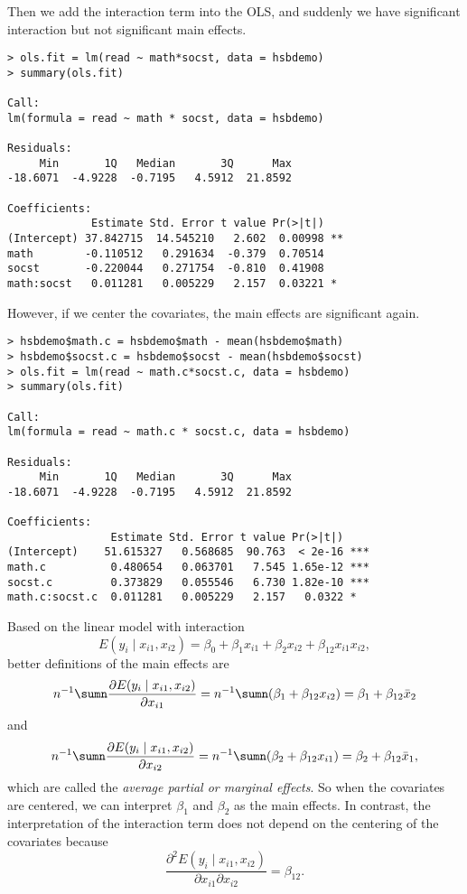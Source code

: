 Then we add the interaction term into the OLS, and suddenly we have
significant interaction but not significant main effects. 
\begin{lstlisting}
> ols.fit = lm(read ~ math*socst, data = hsbdemo)
> summary(ols.fit)

Call:
lm(formula = read ~ math * socst, data = hsbdemo)

Residuals:
     Min       1Q   Median       3Q      Max 
-18.6071  -4.9228  -0.7195   4.5912  21.8592 

Coefficients:
             Estimate Std. Error t value Pr(>|t|)   
(Intercept) 37.842715  14.545210   2.602  0.00998 **
math        -0.110512   0.291634  -0.379  0.70514   
socst       -0.220044   0.271754  -0.810  0.41908   
math:socst   0.011281   0.005229   2.157  0.03221 * 
\end{lstlisting}

However, if we center the covariates, the main effects are significant again. 
\begin{lstlisting}
> hsbdemo$math.c = hsbdemo$math - mean(hsbdemo$math)
> hsbdemo$socst.c = hsbdemo$socst - mean(hsbdemo$socst)
> ols.fit = lm(read ~ math.c*socst.c, data = hsbdemo)
> summary(ols.fit)

Call:
lm(formula = read ~ math.c * socst.c, data = hsbdemo)

Residuals:
     Min       1Q   Median       3Q      Max 
-18.6071  -4.9228  -0.7195   4.5912  21.8592 

Coefficients:
                Estimate Std. Error t value Pr(>|t|)    
(Intercept)    51.615327   0.568685  90.763  < 2e-16 ***
math.c          0.480654   0.063701   7.545 1.65e-12 ***
socst.c         0.373829   0.055546   6.730 1.82e-10 ***
math.c:socst.c  0.011281   0.005229   2.157   0.0322 *  
\end{lstlisting}


Based on the linear model with interaction
$$
E(y_i\mid x_{i1}, x_{i2}) = \beta_0 + \beta_1 x_{i1} + \beta_2 x_{i2} + \beta_{12} x_{i1} x_{i2},
$$
better definitions of the main effects are
$$
n^{-1} \sumn \frac{  \partial E(y_i\mid x_{i1}, x_{i2}) }{ \partial x_{i1} } = n^{-1} \sumn ( \beta_1 +  \beta_{12}   x_{i2}  )
= \beta_1 +  \beta_{12} \bar{x}_2
$$
and
$$
n^{-1} \sumn \frac{  \partial E(y_i\mid x_{i1}, x_{i2}) }{ \partial x_{i2} } = n^{-1} \sumn ( \beta_2 +  \beta_{12}   x_{i1}  )
= \beta_2 +  \beta_{12} \bar{x}_1 ,
$$
which are called the {\it average partial or marginal effects}. 
So when the covariates are centered, we can interpret $\beta_1$ and $\beta_2$ as the main effects. 
In contrast, the interpretation of the interaction term does not depend on the centering of the covariates because
$$
\frac{  \partial^2 E(y_i\mid x_{i1}, x_{i2}) }{ \partial x_{i1} \partial x_{i2}}  = \beta_{12}.
$$

